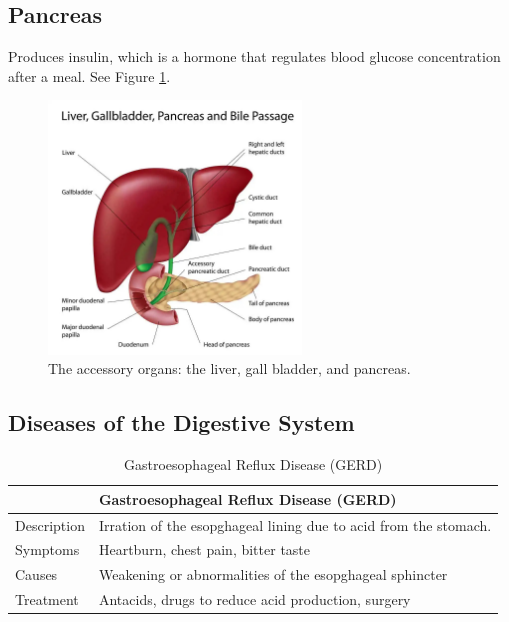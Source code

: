 \documentclass[12pt]{report}
\begin{document}
\subsection{Pancreas}
\begin{definition}[Pancreas]
    Produces insulin, which is a hormone that regulates blood glucose concentration after a meal. See Figure \ref{fig:accessory-organs}.
\end{definition}

\begin{figure}[H]
\centering
    \includegraphics[width=0.6\textwidth]{../figures/accessory organs.jpg}
    \caption{The accessory organs: the liver, gall bladder, and pancreas.}
    \label{fig:accessory-organs}
\end{figure}

\newpage
\subsection{Diseases of the Digestive System}
\begin{table}[h!]
    \renewcommand{\arraystretch}{1.5}
    \setlength{\tabcolsep}{10pt}
    \setlength{\arrayrulewidth}{0.25mm}

    \begin{center}
        \vspace{0.5em}
        \begin{tabular}{|l|l|}
        \hline
         & Gastroesophageal Reflux Disease (GERD) \\ 
        \hline
        Description & Irration of the esopghageal lining due to acid from the stomach. \\
        \hline
        Symptoms & Heartburn, chest pain, bitter taste\\ 
        \hline 
        Causes & Weakening or abnormalities of the esopghageal sphincter\\ 
        \hline 
        Treatment & Antacids, drugs to reduce acid production, surgery\\
        \hline
        \end{tabular}
    \end{center}
    \caption{Gastroesophageal Reflux Disease (GERD)}
\end{table}
\end{document}
